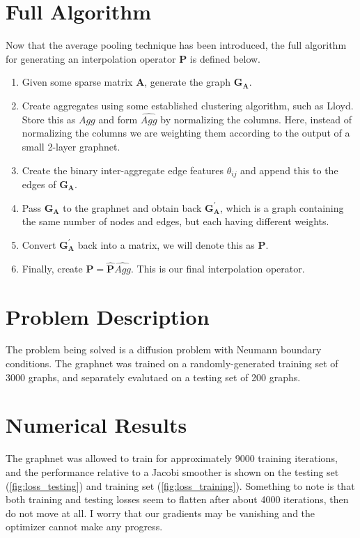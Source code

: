 \documentclass{article}
\newcommand{\mat}[1]{\bm{{#1}}}
\begin{document}
\section{Full Algorithm}
Now that the average pooling technique has been introduced, the full algorithm for generating an interpolation operator $\mat{P}$ is defined below.
\begin{enumerate}
\item Given some sparse matrix $\mat{A}$, generate the graph $\mat{G}_{\mat{A}}$.
\item Create aggregates using some established clustering algorithm, such as Lloyd.  Store this as $Agg$ and form $\hat{Agg}$ by normalizing the columns.  Here, instead of normalizing the columns we are weighting them according to the output of a small 2-layer graphnet.
\item Create the binary inter-aggregate edge features $\theta_{ij}$ and append this to the edges of $\mat{G}_{\mat{A}}$.
\item Pass $\mat{G}_{\mat{A}}$ to the graphnet and obtain back $\mat{G}^\prime_{\mat{A}}$, which is a graph containing the same number of nodes and edges, but each having different weights.
\item Convert $\mat{G}^\prime_{\mat{A}}$ back into a matrix, we will denote this as $\mat{\hat{P}}$.
\item Finally, create $\mat{P}=\mat{\hat{P}}\hat{Agg}$.  This is our final interpolation operator.
\end{enumerate}

\section{Problem Description}
The problem being solved is a diffusion problem with Neumann boundary conditions.  The graphnet was trained on a randomly-generated training set of 3000 graphs, and separately evalutaed on a testing set of 200 graphs.

\section{Numerical Results}
The graphnet was allowed to train for approximately 9000 training iterations, and the performance relative to a Jacobi smoother is shown on the testing set (\ref{fig:loss_testing}) and training set (\ref{fig:loss_training}).  Something to note is that both training and testing losses seem to flatten after about 4000 iterations, then do not move at all.  I worry that our gradients may be vanishing and the optimizer cannot make any progress.
\end{document}
